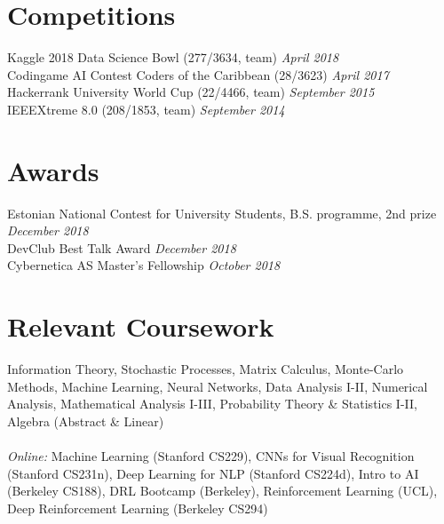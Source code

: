 \documentclass[margin,line]{res}
\begin{document}
\begin{resume}
\section{\sc Competitions}
Kaggle 2018 Data Science Bowl (277/3634, team) \hfill {\it April 2018}\vspace*{+.05in}\\
Codingame AI Contest Coders of the Caribbean (28/3623) \hfill {\it April 2017}\vspace*{+.05in}\\
Hackerrank University World Cup (22/4466, team) \hfill {\it September 2015}\vspace*{+.05in}\\
IEEEXtreme 8.0 (208/1853, team) \hfill {\it September 2014}

\section{\sc Awards}
Estonian National Contest for University Students, B.S. programme, 2nd prize \hfill {\it December 2018}\vspace*{+.05in}\\
DevClub Best Talk Award \hfill {\it December 2018}\vspace*{+.05in}\\
Cybernetica AS  Master's Fellowship \hfill {\it October 2018}


\section{\sc Relevant Coursework}
Information Theory, Stochastic Processes, Matrix Calculus, Monte-Carlo Methods, Machine Learning, Neural Networks, Data Analysis I-II, Numerical Analysis, Mathematical Analysis I-III, Probability Theory \& Statistics I-II, Algebra (Abstract \& Linear)
\vspace*{-.1in}
\\\\
{\it Online:} Machine Learning (Stanford CS229), CNNs for Visual Recognition (Stanford CS231n), Deep Learning for NLP (Stanford CS224d),
Intro to AI (Berkeley CS188), DRL Bootcamp (Berkeley), Reinforcement Learning (UCL), Deep Reinforcement Learning (Berkeley CS294)


\end{resume}
\end{document}
